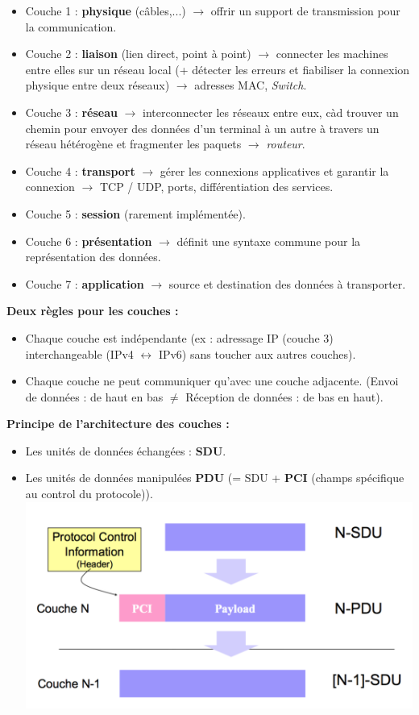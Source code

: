 \documentclass[a4paper,9pt, twocolumn]{article}
\newcommand\rar{\rightarrow}
\begin{document}
\begin{itemize}
\begin{center}
		\end{center}
		\item Couche 1 : \textbf{physique} (câbles,...) $\rar$ offrir un support de transmission pour la communication.
		\item Couche 2 : \textbf{liaison} (lien direct, point à point) $\rar$ connecter les machines entre elles sur un réseau local (+ détecter les erreurs et fiabiliser la connexion physique entre deux réseaux) $\rar$ adresses MAC, \emph{Switch}.
		\item Couche 3 : \textbf{réseau} $\rar$ interconnecter les réseaux entre eux, càd trouver un chemin pour envoyer des données d'un terminal à un autre à travers un réseau hétérogène et fragmenter les paquets $\rar$ \emph{routeur}.
		\item Couche 4 : \textbf{transport} $\rar$ gérer les connexions applicatives et garantir la connexion $\rar$ TCP / UDP, ports, différentiation des services.
		\item Couche 5 : \textbf{session} (rarement implémentée).
		\item Couche 6 : \textbf{présentation} $\rar$ définit une syntaxe commune pour la représentation des données.
		\item Couche 7 : \textbf{application} $\rar$ source et destination des données à transporter.
	\end{itemize}

	\textbf{Deux règles pour les couches : }
	\begin{itemize}
		\item Chaque couche est indépendante (ex : adressage IP (couche 3) interchangeable (IPv4 $\leftrightarrow$ IPv6) sans toucher aux autres couches).
		\item Chaque couche ne peut communiquer qu'avec une couche adjacente. (Envoi de données : de haut en bas $\neq$ Réception de données : de bas en haut).
	\end{itemize}

	\textbf{Principe de l'architecture des couches :}
	\begin{itemize}
		\item Les unités de données échangées : \textbf{SDU}.
		\item Les unités de données manipulées \textbf{PDU} (= SDU + \textbf{PCI} (champs spécifique au control du protocole)).
			\includegraphics[scale=0.4]{PDU.png}
	\end{itemize}
	
\end{document}
